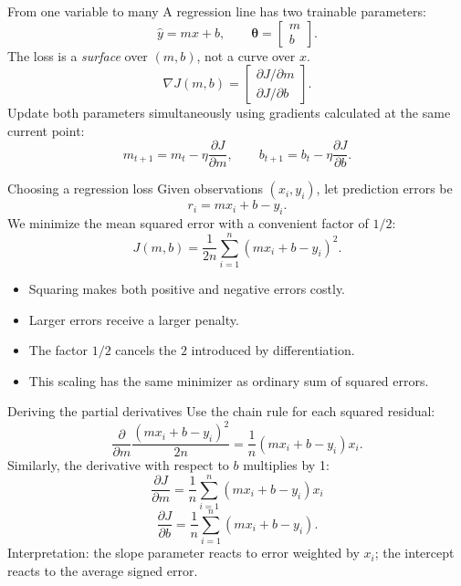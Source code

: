 \documentclass[aspectratio=169,11pt]{beamer}
\begin{document}
\begin{frame}{From one variable to many}
A regression line has two trainable parameters:
\[
\widehat y=mx+b,\qquad \boldsymbol\theta=\begin{bmatrix}m\\b\end{bmatrix}.
\]
The loss is a \emph{surface} over $(m,b)$, not a curve over $x$.
\[
\nabla J(m,b)=\begin{bmatrix}\partial J/\partial m\\[4pt]\partial J/\partial b\end{bmatrix}.
\]
Update both parameters simultaneously using gradients calculated at the same current point:
\[
\boxed{m_{t+1}=m_t-\eta\frac{\partial J}{\partial m}},\qquad
\boxed{b_{t+1}=b_t-\eta\frac{\partial J}{\partial b}}.
\]
\end{frame}

\begin{frame}{Choosing a regression loss}
Given observations $(x_i,y_i)$, let prediction errors be
\[
r_i=mx_i+b-y_i.
\]
We minimize the mean squared error with a convenient factor of $1/2$:
\[
\boxed{J(m,b)=\frac{1}{2n}\sum_{i=1}^n(mx_i+b-y_i)^2}.
\]
\begin{itemize}
\item Squaring makes both positive and negative errors costly.
\item Larger errors receive a larger penalty.
\item The factor $1/2$ cancels the $2$ introduced by differentiation.
\item This scaling has the same minimizer as ordinary sum of squared errors.
\end{itemize}
\end{frame}

\begin{frame}{Deriving the partial derivatives}
Use the chain rule for each squared residual:
\[
\frac{\partial}{\partial m}\frac{(mx_i+b-y_i)^2}{2n}
=\frac{1}{n}(mx_i+b-y_i)x_i.
\]
Similarly, the derivative with respect to $b$ multiplies by 1:
\[
\boxed{\frac{\partial J}{\partial m}=\frac1n\sum_{i=1}^n (mx_i+b-y_i)x_i}
\]
\[
\boxed{\frac{\partial J}{\partial b}=\frac1n\sum_{i=1}^n (mx_i+b-y_i)}.
\]
\smallskip
\alert{Interpretation:} the slope parameter reacts to error weighted by $x_i$; the intercept reacts to the average signed error.
\end{frame}
\end{document}
